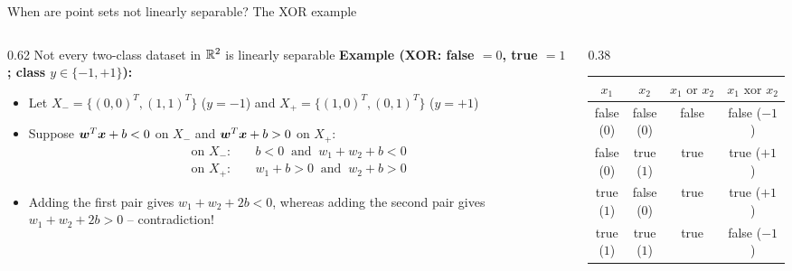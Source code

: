 \documentclass[aspectratio=169]{beamer}\usepackage[]{graphicx}\usepackage[]{xcolor}
\begin{document}
\begin{frame}[importantcolour]{When are point sets not linearly separable? The XOR example}
    \begin{columns}[c]
    \begin{column}{0.62\textwidth}
        Not every two-class dataset in $\mathbb{R}^2$ is linearly separable
        \vskip0.1cm
        \textbf{Example (XOR: false $= 0$, true $= 1$; class $y \in \{-1, +1\}$):}
        \begin{itemize}
            \item Let $X_- = \{(0, 0)^T, (1, 1)^T\}$ ($y = -1$) and $X_+ = \{(1, 0)^T, (0, 1)^T\}$ ($y = +1$)
            \item Suppose $\bm{w}^T \bm{x} + b < 0$ on $X_-$ and $\bm{w}^T \bm{x} + b > 0$ on $X_+$:
            \begin{align*}
                \text{on } X_-: &\quad b < 0 \;\;\text{and}\;\; w_1 + w_2 + b < 0 \\
                \text{on } X_+: &\quad w_1 + b > 0 \;\;\text{and}\;\; w_2 + b > 0
            \end{align*}
            \item Adding the first pair gives $w_1 + w_2 + 2b < 0$, whereas adding the second pair gives $w_1 + w_2 + 2b > 0$ -- contradiction!
        \end{itemize}
    \end{column}
    \begin{column}{0.38\textwidth}
        \centering
        {\scriptsize
        \begin{tabular}{@{}cccc@{}}
            \toprule
            $x_1$ & $x_2$ & $x_1\text{ or }x_2$ & $x_1\text{ xor }x_2$ \\
            \midrule
            false ($0$) & false ($0$) & false & false ($-1$) \\
            false ($0$) & true ($1$)  & true  & true ($+1$) \\
            true ($1$)  & false ($0$) & true  & true ($+1$) \\
            true ($1$)  & true ($1$)  & true  & false ($-1$) \\
            \bottomrule
        \end{tabular}}
        \vskip0.25cm
    \end{column}
    \end{columns}
\end{frame}
\end{document}
